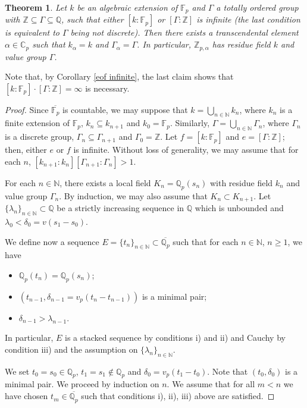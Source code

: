 \documentclass[10pt]{article}
\numberwithin{equation}{section}
\newtheorem{Thm}[equation]{Theorem}
\theoremstyle{definition}\newtheorem{Def}[equation]{Definition}
\theoremstyle{definition}\newtheorem{Ques}[equation]{Question}
\newcommand{\F}{\mathbb{F}}
\newcommand{\Q}{\mathbb{Q}}
\newcommand{\N}{\mathbb{N}}
\newcommand{\Z}{\mathbb{Z}}
\newcommand{\C}{\mathbb{C}}
\newcommand{\oQp}{\overline{\Q_p}}
\begin{document}
\begin{Thm}\label{prescribed residue field and value group}
Let $k$ be an algebraic extension of $\F_p$ and $\Gamma$ a totally ordered group with $\Z\subseteq\Gamma\subseteq\Q$, such that either $[k:\F_p]$ or $[\Gamma:\Z]$ is infinite (the last condition is equivalent to $\Gamma$ being not discrete). Then there exists a transcendental element $\alpha\in\C_p$ such that $k_{\alpha}=k$ and  $\Gamma_{\alpha}=\Gamma$. In particular, $\Z_{p,\alpha}$ has residue field $k$ and value group $\Gamma$.
\end{Thm}
Note that, by Corollary \ref{eof infinite}, the last claim shows that $[k:\F_p]\cdot[\Gamma:\Z]=\infty$ is necessary.
\begin{proof}
Since $\overline{\F_p}$ is countable, we may suppose that $k=\bigcup_{n\in\N}k_n$, where $k_n$ is a finite extension of $\mathbb{F}_p$, $k_n\subseteq k_{n+1}$ and $k_0=\mathbb{F}_p$. Similarly, $\Gamma=\bigcup_{n\in\N}\Gamma_n$, where $\Gamma_n$ is a discrete group, $\Gamma_n\subseteq\Gamma_{n+1}$ and $\Gamma_0=\Z$. Let $f=[k:\F_p]$ and $e=[\Gamma:\Z]$; then, either $e$ or $f$ is infinite. Without loss of generality, we may assume that for each $n$, $[k_{n+1}:k_n][\Gamma_{n+1}:\Gamma_n]>1$.

For each $n\in\N$, there exists a local field  $K_n=\Q_p(s_n)$ with residue field $k_n$ and value group $\Gamma_n$. By induction, we may also assume that $K_n\subset K_{n+1}$. Let $\{\lambda_n\}_{n\in\N}\subset\Q$ be a strictly increasing sequence in $\Q$ which is unbounded and $\lambda_0<\delta_0=v(s_1-s_0)$.

We define now a sequence $E=\{t_n\}_{n\in\N}\subset\oQp$ such that for each $n\in\N$, $n\geq 1$, we have
\begin{itemize}
\item[i)] $\Q_p(t_n)=\Q_p(s_n)$;
\item[ii)] $(t_{n-1},\delta_{n-1}=v_p(t_n-t_{n-1}))$ is a minimal pair;
\item[iii)] $\delta_{n-1}>\lambda_{n-1}$.
\end{itemize}
In particular, $E$ is a stacked sequence by conditions i) and ii) and Cauchy by condition iii) and the assumption on $\{\lambda_n\}_{n\in\N}$.

We set $t_0=s_0\in\Q_p$, $t_1=s_1\not\in\Q_p$ and $\delta_0=v_p(t_1-t_0)$. Note that $(t_0,\delta_0)$ is a minimal pair. We proceed by induction on $n$. We assume that for all $m<n$ we have chosen $t_m\in\oQp$ such that conditions i), ii), iii) above are satisfied.


\end{proof}
\end{document}
